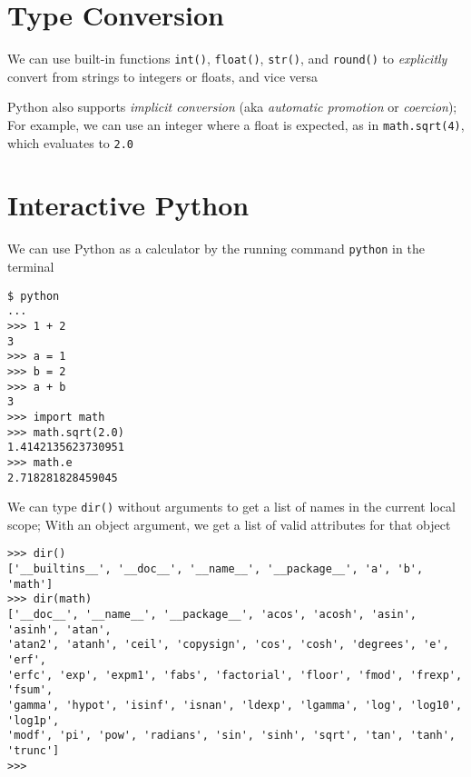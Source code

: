 \documentclass[8pt,a4paper,compress]{beamer}
\begin{document}
\section{Type Conversion}
\begin{frame}[fragile]
We can use built-in functions \lstinline{int()}, \lstinline{float()}, \lstinline{str()}, and \lstinline{round()} to \emph{explicitly} convert from strings to integers or floats, and vice versa

\bigskip

Python also supports \emph{implicit conversion} (aka \emph{automatic promotion} or \emph{coercion}); For example, we can use an integer where a float is expected, as in \lstinline{math.sqrt(4)}, which evaluates to \lstinline{2.0}
\end{frame}

\section{Interactive Python}
\begin{frame}[fragile]
We can use Python as a calculator by the running command \lstinline{python} in the terminal

\begin{lstlisting}[language={}]
$ python
...
>>> 1 + 2
3
>>> a = 1
>>> b = 2
>>> a + b
3
>>> import math
>>> math.sqrt(2.0)
1.4142135623730951
>>> math.e
2.718281828459045
\end{lstlisting}

\bigskip

We can type \lstinline{dir()} without arguments to get a list of names in the current local scope; With an object argument, we get a list of valid attributes for that object
\begin{lstlisting}[language={}]
>>> dir()
['__builtins__', '__doc__', '__name__', '__package__', 'a', 'b', 'math']
>>> dir(math)
['__doc__', '__name__', '__package__', 'acos', 'acosh', 'asin', 'asinh', 'atan', 
'atan2', 'atanh', 'ceil', 'copysign', 'cos', 'cosh', 'degrees', 'e', 'erf', 
'erfc', 'exp', 'expm1', 'fabs', 'factorial', 'floor', 'fmod', 'frexp', 'fsum', 
'gamma', 'hypot', 'isinf', 'isnan', 'ldexp', 'lgamma', 'log', 'log10', 'log1p', 
'modf', 'pi', 'pow', 'radians', 'sin', 'sinh', 'sqrt', 'tan', 'tanh', 'trunc']
>>> 
\end{lstlisting}
\end{frame}
\end{document}
